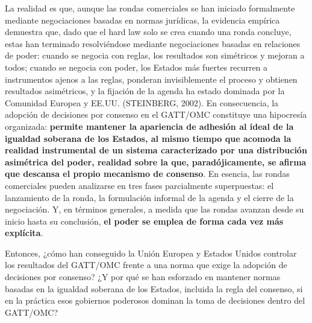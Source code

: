 \documentclass[10pt,a4paper]{article}
\begin{document}
La realidad es que, aunque las rondas comerciales se han iniciado formalmente mediante negociaciones basadas en normas jurídicas, la evidencia empírica demuestra que, dado que el hard law solo se crea cuando una ronda concluye, estas han terminado resolviéndose mediante negociaciones basadas en relaciones de poder: cuando se negocia con reglas, los resultados son simétricos y mejoran a todos; cuando se negocia con poder, los Estados más fuertes recurren a instrumentos ajenos a las reglas, ponderan invisiblemente el proceso y obtienen resultados asimétricos, y la fijación de la agenda ha estado dominada por la Comunidad Europea y EE.UU. (STEINBERG, 2002). En consecuencia, la adopción de decisiones por consenso en el GATT/OMC constituye una hipocresía organizada: \textbf{permite mantener la apariencia de adhesión al ideal de la igualdad soberana de los Estados, al mismo tiempo que acomoda la realidad instrumental de un sistema caracterizado por una distribución asimétrica del poder, realidad sobre la que, paradójicamente, se afirma que descansa el propio mecanismo de consenso}. En esencia, las rondas comerciales pueden analizarse en tres fases parcialmente superpuestas: el lanzamiento de la ronda, la formulación informal de la agenda y el cierre de la negociación. Y, en términos generales, a medida que las rondas avanzan desde su inicio hasta su conclusión, \textbf{el poder se emplea de forma cada vez más explícita}.

Entonces, ¿cómo han conseguido la Unión Europea y Estados Unidos controlar los resultados del GATT/OMC frente a una norma que exige la adopción de decisiones por consenso? ¿Y por qué se han esforzado en mantener normas basadas en la igualdad soberana de los Estados, incluida la regla del consenso, si en la práctica esos gobiernos poderosos dominan la toma de decisiones dentro del GATT/OMC?
\end{document}
